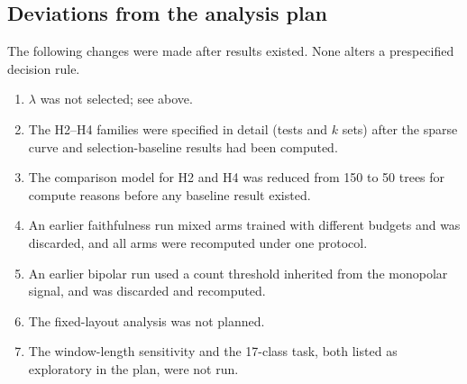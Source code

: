 \subsection{Deviations from the analysis plan}
\label{sec:deviations}
The following changes were made after results existed. None alters a prespecified decision rule.
\begin{enumerate}
\item $\lambda$ was not selected; see above.
\item The H2--H4 families were specified in detail (tests and $k$ sets) after the sparse curve and selection-baseline results had been computed.
\item The comparison model for H2 and H4 was reduced from 150 to 50 trees for compute reasons before any baseline result existed.
\item An earlier faithfulness run mixed arms trained with different budgets and was discarded, and all arms were recomputed under one protocol.
\item An earlier bipolar run used a count threshold inherited from the monopolar signal, and was discarded and recomputed.
\item The fixed-layout analysis was not planned.
\item The window-length sensitivity and the 17-class task, both listed as exploratory in the plan, were not run.
\end{enumerate}

